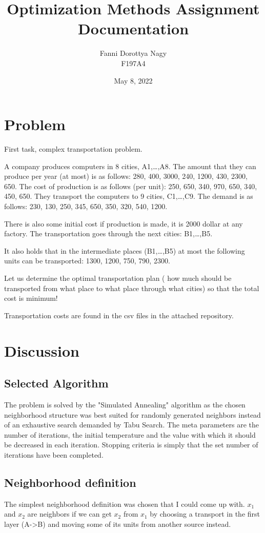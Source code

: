 \documentclass{article}
\author{Fanni Dorottya Nagy\\F197A4}
\date{May 8, 2022}
\title{Optimization Methods Assignment Documentation}
\begin{document}
\maketitle
\section{Problem}
First task, complex transportation problem.

A company produces computers in 8 cities, A1,…,A8.
The amount that they can produce per year (at most) is as follows: 280, 400, 3000, 240, 1200, 430,
2300, 650.
The cost of production is as follows (per unit): 250, 650, 340, 970, 650, 340, 450, 650.
They transport the computers to 9 cities, C1,…,C9.
The demand is as follows: 230, 130, 250, 345, 650, 350, 320, 540, 1200.

There is also some initial cost if production is made, it is 2000 dollar at any factory.
The transportation goes through the next cities: B1,…,B5.

It also holds that in the intermediate places (B1,…,B5) at most the following units can be
transported: 1300, 1200, 750, 790, 2300.

Let us determine the optimal transportation plan ( how much should be transported from what place
to what place through what cities) so that the total cost is minimum!

Transportation costs are found in the csv files in the attached repository.

\section{Discussion}
\subsection{Selected Algorithm}
The problem is solved by the "Simulated Annealing" algorithm as the chosen neighborhood structure was best suited for randomly generated neighbors instead of an exhaustive search demanded by Tabu Search.
The meta parameters are the number of iterations, the initial temperature and the value with which it should be decreased in each iteration.
Stopping criteria is simply that the set number of iterations have been completed.

\subsection{Neighborhood definition}
The simplest neighborhood definition was chosen that I could come up with.
$x_1$ and $x_2$ are neighbors if we can get $x_2$ from $x_1$ by choosing a transport in the first layer (A-\textgreater B) and moving some of its units from another source instead.
\end{document}
